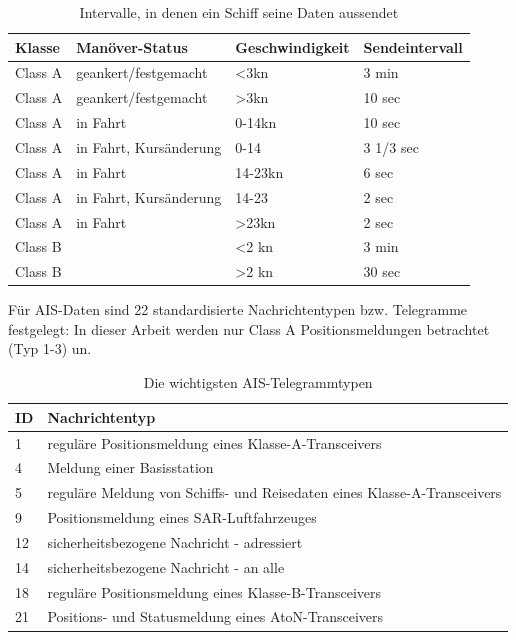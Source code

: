 \begin{table}[!hbt]\vspace{1ex}\centering
\begin{tabular}{|l|l|l|l|}\hline
Klasse &Manöver-Status & Geschwindigkeit &Sendeintervall\\\hline\hline
Class A&geankert/festgemacht&<3kn&3 min\\
Class A&geankert/festgemacht&>3kn&10 sec\\
Class A&in Fahrt&0-14kn&10 sec\\
Class A&in Fahrt, Kursänderung&0-14&3 1/3 sec\\
Class A&in Fahrt&14-23kn&6 sec\\
Class A&in Fahrt, Kursänderung&14-23&2 sec\\
Class A&in Fahrt&>23kn&2 sec\\
Class B&&<2 kn&3 min\\
Class B&&>2 kn&30 sec\\\hline
\end{tabular}
\caption[Intervalle, in denen ein Schiff seine Daten aussendet] {Intervalle, in denen ein Schiff seine Daten aussendet}
\end{table}

Für AIS-Daten sind 22 standardisierte Nachrichtentypen bzw. Telegramme festgelegt:
In dieser Arbeit werden nur Class A Positionsmeldungen betrachtet (Typ 1-3) un.
\begin{table}[!hbt]
\centering
\begin{tabular}{|l|l|}\hline
ID&Nachrichtentyp\\\hline\hline
1& reguläre Positionsmeldung eines Klasse-A-Transceivers\\
4 & Meldung einer Basisstation\\
5& reguläre Meldung von Schiffs- und Reisedaten eines Klasse-A-Transceivers\\
9 & Positionsmeldung eines SAR-Luftfahrzeuges\\
12& sicherheitsbezogene Nachricht - adressiert\\
14& sicherheitsbezogene Nachricht - an alle\\
18& reguläre Positionsmeldung eines Klasse-B-Transceivers\\
21& Positions- und Statusmeldung eines AtoN-Transceivers\\\hline
\end{tabular}
\caption[Die wichtigsten AIS-Telegrammtypen] {Die wichtigsten AIS-Telegrammtypen}
\end{table}

